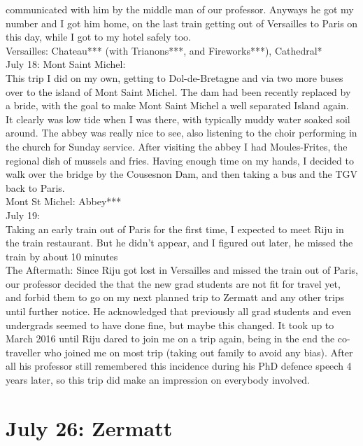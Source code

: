 communicated with him by the middle man of our professor. Anyways he got my number and I got him home, on the last train getting out of Versailles to Paris on this day, while I got to my hotel safely too.\\

Versailles: Chateau*** (with Trianons***, and Fireworks***), Cathedral*\\

July 18: Mont Saint Michel:\\
This trip I did on my own, getting to Dol-de-Bretagne and via two more buses over to the island of Mont Saint Michel. The dam had been recently replaced by a bride, with the goal to make Mont Saint Michel a well separated Island again. It clearly was low tide when I was there, with typically muddy water soaked soil around. The abbey was really nice to see, also listening to the choir performing in the church for Sunday service. After visiting the abbey I had Moules-Frites, the regional dish of mussels and fries. Having enough time on my hands, I decided to walk over the bridge by the Cousesnon Dam, and then taking a bus and the TGV back to Paris.\\

Mont St Michel: Abbey***\\

July 19:\\
Taking an early train out of Paris for the first time, I expected to meet Riju in the train restaurant. But he didn't appear, and I figured out later, he missed the train by about 10 minutes\\

The Aftermath: Since Riju got lost in Versailles and missed the train out of Paris, our professor decided the that the new grad students are not fit for travel yet, and forbid them to go on my next planned trip to Zermatt and any other trips until further notice. He acknowledged that previously all grad students and even undergrads seemed to have done fine, but maybe this changed. It took up to March 2016 until Riju dared to join me on a trip again, being in the end the co-traveller who joined me on most trip (taking out family to avoid any bias). After all his professor still remembered this incidence during his PhD defence speech 4 years later, so this trip did make an impression on everybody involved.

\section{July 26: Zermatt}
\label{Zermatt2015}

